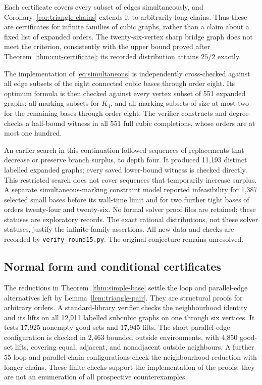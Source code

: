 \documentclass[11pt]{article}
\begin{document}
Each certificate covers every subset of edges simultaneously,
and Corollary~\ref{cor:triangle-chains} extends it to arbitrarily
long chains. Thus these are certificates for infinite families of
cubic graphs, rather than a claim about a fixed list of expanded
orders. The twenty-six-vertex sharp bridge graph does not meet
the criterion, consistently with the upper bound proved after
Theorem~\ref{thm:cut-certificate}; its recorded distribution attains
$25/2$ exactly.

The implementation of \eqref{eq:simultaneous} is independently
cross-checked against all edge subsets of the eight connected
cubic bases through order eight. Its optimum formula is then
checked against every vertex subset of 551 expanded graphs:
all marking subsets for $K_4$, and all marking subsets of size
at most two for the remaining bases through order eight. The
verifier constructs and degree-checks a half-bound witness in
all 551 full cubic completions, whose orders are at most one hundred.

An earlier search in this continuation followed sequences of
replacements that decrease or preserve branch surplus, to depth
four. It produced 11,193 distinct labelled expanded graphs; every
saved lower-bound witness is checked directly. This restricted
search does not cover sequences that temporarily increase surplus.
A separate simultaneous-marking constraint model reported
infeasibility for 1,387 selected small bases before its wall-time
limit and for two further tight bases of orders twenty-four and
twenty-six. No formal solver proof files are retained; these
statuses are exploratory records. The exact rational distributions,
not these solver statuses, justify the infinite-family assertions.
All new data and checks are recorded by \texttt{verify\_round15.py}.
The original conjecture remains unresolved.

\subsection{Normal form and conditional certificates}\label{sec:round16}
The reductions in Theorem~\ref{thm:simple-base} settle the loop
and parallel-edge alternatives left by
Lemma~\ref{lem:triangle-pair}. They are structural proofs for
arbitrary orders. A standard-library verifier checks the
neighbourhood identity and its lifts on all 12,911 labelled
subcubic graphs on one through six vertices. It tests 17,925
nonempty good sets and 17,945 lifts. The short parallel-edge
configuration is checked in 2,463 bounded outside environments,
with 4,850 good-set lifts, covering equal, adjacent, and nonadjacent
outside neighbours. A further 55 loop and parallel-chain
configurations check the neighbourhood reduction with longer chains.
These finite checks support the implementation of the proofs; they
are not an enumeration of all prospective counterexamples.
\end{document}
